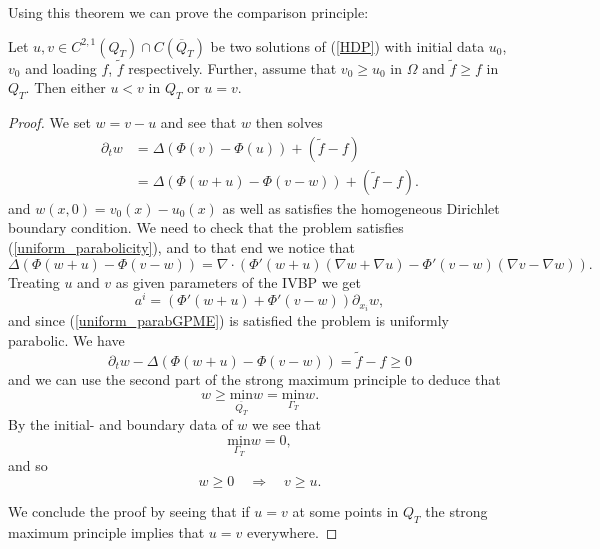 \documentclass[11pt, a4paper]{article}
\begin{document}
Using this theorem we can prove the comparison principle:
\begin{lemma}
\label{lemma:comparison}
Let $u,v \in C^{2,1}(Q_T)\cap C(\overline{Q}_T)$ be two solutions of (\ref{HDP}) with initial data $u_0$, $v_0$ and loading $f$, $\tilde{f}$ respectively. Further, assume that $v_0 \geq u_0$ in $\Omega$ and  $\tilde{f} \geq f$ in $Q_T$. Then either $u < v$ in $Q_T$ or $u=v$.
\end{lemma}
\begin{proof}
We set $w=v-u$ and see that $w$ then solves
\begin{align*}
\partial_t w &= \Delta(\Phi(v) - \Phi(u)) + (\tilde{f}-f) \\
			&= \Delta(\Phi(w+u) - \Phi(v-w)) + (\tilde{f}-f).  
\end{align*}
and $w(x,0) = v_0(x) - u_0(x)$ as well as satisfies the homogeneous Dirichlet boundary condition. We need to check that the problem satisfies (\ref{uniform_parabolicity}), and to that end we notice that
\begin{equation*}
\Delta(\Phi(w+u) - \Phi(v-w)) = \nabla \cdot \left(\Phi'(w+u)(\nabla w + \nabla u) - \Phi'(v-w)(\nabla v - \nabla w) \right).
\end{equation*}
Treating $u$ and $v$ as given parameters of the IVBP we get
\begin{equation*}
a^i = (\Phi'(w+u) + \Phi'(v-w))\partial_{x_i}w,
\end{equation*}
and since (\ref{uniform_parabGPME}) is satisfied the problem is uniformly parabolic.
We have
\begin{equation*}
\partial_tw - \Delta(\Phi(w+u) - \Phi(v-w)) = \tilde{f}-f \geq 0 
\end{equation*}
and we can use the second part of the strong maximum principle to deduce that
\begin{equation*}
w \geq \underset{\overline{Q_T}}{\mathrm{min}}w = \underset{\Gamma_T}{\mathrm{min}}w.
\end{equation*}
By the initial- and boundary data of $w$ we see that
\begin{equation*}
\underset{\Gamma_T}{\mathrm{min}}w = 0,
\end{equation*}
and so
\begin{equation*}
w \geq 0 \quad \Rightarrow  \quad v \geq u.
\end{equation*}

We conclude the proof by seeing that if $u=v$ at some points in $Q_T$ the strong maximum principle implies that $u=v$ everywhere. 
\end{proof}
\end{document}
